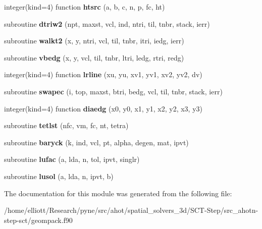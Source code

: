 \begin{DoxyCompactItemize}
\item 
\hypertarget{classgeompack_ac0a055d7534043b545b23cb09104b68e}{integer(kind=4) function {\bfseries htsrc} (a, b, c, n, p, fc, ht)}\label{classgeompack_ac0a055d7534043b545b23cb09104b68e}

\item 
\hypertarget{classgeompack_ac83af4943560085ee3f25b817aa45b9c}{subroutine {\bfseries dtriw2} (npt, maxst, vcl, ind, ntri, til, tnbr, stack, ierr)}\label{classgeompack_ac83af4943560085ee3f25b817aa45b9c}

\item 
\hypertarget{classgeompack_a25b0a5c22a744be77665e36e4a1062af}{subroutine {\bfseries walkt2} (x, y, ntri, vcl, til, tnbr, itri, iedg, ierr)}\label{classgeompack_a25b0a5c22a744be77665e36e4a1062af}

\item 
\hypertarget{classgeompack_a38c94eee465e80bf8838faf84fbecc0c}{subroutine {\bfseries vbedg} (x, y, vcl, til, tnbr, ltri, ledg, rtri, redg)}\label{classgeompack_a38c94eee465e80bf8838faf84fbecc0c}

\item 
\hypertarget{classgeompack_a9ad84c591ca6884ed9df315f68f3f30c}{integer(kind=4) function {\bfseries lrline} (xu, yu, xv1, yv1, xv2, yv2, dv)}\label{classgeompack_a9ad84c591ca6884ed9df315f68f3f30c}

\item 
\hypertarget{classgeompack_a55066c94f489f5a120f06c1f576e167f}{subroutine {\bfseries swapec} (i, top, maxst, btri, bedg, vcl, til, tnbr, stack, ierr)}\label{classgeompack_a55066c94f489f5a120f06c1f576e167f}

\item 
\hypertarget{classgeompack_aa309a784a534b06779c17338510e1d7e}{integer(kind=4) function {\bfseries diaedg} (x0, y0, x1, y1, x2, y2, x3, y3)}\label{classgeompack_aa309a784a534b06779c17338510e1d7e}

\item 
\hypertarget{classgeompack_a4ea8209ecfbd40ef48d79302d930352f}{subroutine {\bfseries tetlst} (nfc, vm, fc, nt, tetra)}\label{classgeompack_a4ea8209ecfbd40ef48d79302d930352f}

\item 
\hypertarget{classgeompack_ac332e0faf391cc194c70cfc300de1059}{subroutine {\bfseries baryck} (k, ind, vcl, pt, alpha, degen, mat, ipvt)}\label{classgeompack_ac332e0faf391cc194c70cfc300de1059}

\item 
\hypertarget{classgeompack_aa3c5e87b0e2e939bb490bb9591939213}{subroutine {\bfseries lufac} (a, lda, n, tol, ipvt, singlr)}\label{classgeompack_aa3c5e87b0e2e939bb490bb9591939213}

\item 
\hypertarget{classgeompack_a4b68a0623aa709973fa045f833408ce4}{subroutine {\bfseries lusol} (a, lda, n, ipvt, b)}\label{classgeompack_a4b68a0623aa709973fa045f833408ce4}

\end{DoxyCompactItemize}


The documentation for this module was generated from the following file\-:\begin{DoxyCompactItemize}
\item 
/home/elliott/\-Research/pyne/src/ahot/spatial\-\_\-solvers\-\_\-3d/\-S\-C\-T-\/\-Step/src\-\_\-ahotn-\/step-\/sct/geompack.\-f90\end{DoxyCompactItemize}
